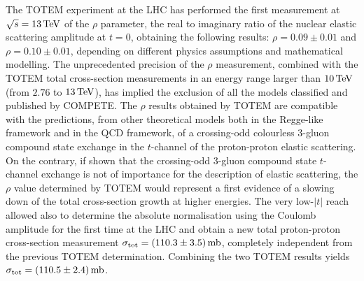 The TOTEM experiment at the LHC has performed the first measurement at $\sqrt s = 13\,{\rm TeV}$ of the $\rho$ parameter, the real to imaginary ratio of the nuclear elastic scattering amplitude at $t=0$, obtaining the following results: $\rho = 0.09 \pm 0.01$ and $\rho = 0.10 \pm 0.01$, depending on different physics assumptions and mathematical modelling. The unprecedented precision of the $\rho$ measurement, combined with the TOTEM total cross-section measurements in an energy range larger than $10\,{\rm TeV}$ (from $2.76$ to $13\,{\rm TeV}$), has implied the exclusion of all the models classified and published by COMPETE. The $\rho$ results obtained by TOTEM are compatible with the predictions, from other theoretical models both in the Regge-like framework and in the QCD framework, of a crossing-odd colourless 3-gluon compound state exchange in the $t$-channel of the proton-proton elastic scattering. On the contrary, if shown that the crossing-odd 3-gluon compound state $t$-channel exchange is not of importance for the description of elastic scattering, the $\rho$ value determined by TOTEM would represent a first evidence of a slowing down of the total cross-section growth at higher energies.
%
The very low-$|t|$ reach allowed also to determine the absolute normalisation using the Coulomb amplitude for the first time at the LHC and obtain a new total proton-proton cross-section measurement $\sigma_{\rm tot} = (110.3 \pm 3.5)\,{\rm mb}$, completely independent from the previous TOTEM determination. Combining the two TOTEM results yields $\sigma_{\rm tot} = (110.5 \pm 2.4)\,{\rm mb}$.
